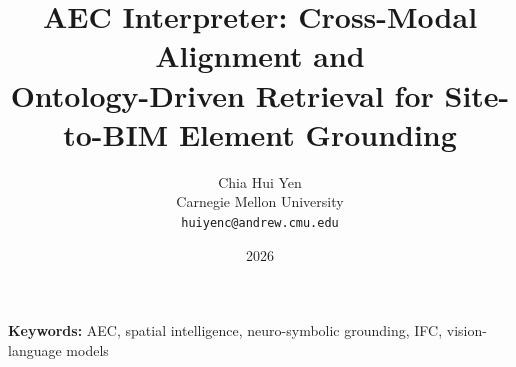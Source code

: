 \documentclass[11pt]{article}
\title{\bfseries AEC Interpreter: Cross-Modal Alignment and\\
Ontology-Driven Retrieval for Site-to-BIM Element Grounding}
\author{Chia Hui Yen\\
\small Carnegie Mellon University\\
\small \texttt{huiyenc@andrew.cmu.edu}}
\date{2026}
\begin{document}
\maketitle

\begin{abstract}

\end{abstract}

\noindent\textbf{Keywords:} AEC, spatial intelligence, neuro-symbolic grounding, IFC, vision-language models









\end{document}

